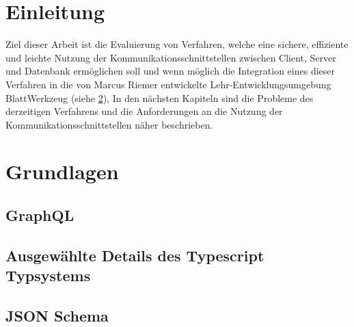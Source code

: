 
\chapter{Einleitung}
\label{sec:requirements}

Ziel dieser Arbeit ist die Evaluierung von Verfahren, welche eine sichere, effiziente und leichte Nutzung der Kommunikationsschnittstellen 
zwischen Client, Server und Datenbank ermöglichen soll und wenn möglich die Integration eines dieser Verfahren
in die von Marcus Riemer entwickelte Lehr-Entwicklungsumgebung BlattWerkzeug (siehe \ref{sec:requirements:existing}), 
In den nächsten Kapiteln sind die Probleme des derzeitigen Verfahrens und die Anforderungen an die Nutzung der Kommunikationsschnittstellen näher beschrieben.

\chapter{Grundlagen}
\label{sec:requirements:existing}

\section{GraphQL}

\section{Ausgewählte Details des Typescript Typsystems}

\section{JSON Schema}

